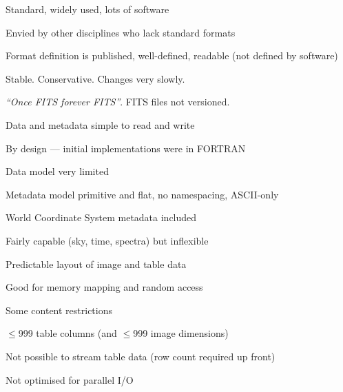 \documentclass[20pt,landscape]{foils}
\begin{document}
\begin{list1}
  \item Standard, widely used, lots of software
\vspace*{-0.2cm}
  \begin{list2}
    \item Envied by other disciplines who lack standard formats
\vspace*{-0.1cm}
  \end{list2}
  \item Format definition is published, well-defined, readable
        (not defined by software)
  \item Stable.  Conservative.  Changes very slowly.
\vspace*{-0.2cm}
  \begin{list2}
    \item {\sl ``Once FITS forever FITS''}.
          FITS files not versioned.
\vspace*{-0.1cm}
  \end{list2}
  \item Data and metadata simple to read and write
\vspace*{-0.2cm}
  \begin{list2}
    \item By design --- initial implementations were in FORTRAN
\vspace*{-0.1cm}
    \item Data model very limited
\vspace*{-0.1cm}
    \item Metadata model primitive and flat, no namespacing, ASCII-only
\vspace*{-0.1cm}
  \end{list2}
  \item World Coordinate System metadata included
\vspace*{-0.2cm}
  \begin{list2}
    \item Fairly capable (sky, time, spectra) but inflexible
\vspace*{-0.1cm}
  \end{list2}
  \item Predictable layout of image and table data
\vspace*{-0.2cm}
  \begin{list2}
    \item Good for memory mapping and random access
\vspace*{-0.1cm}
  \end{list2}
  \item Some content restrictions
\vspace*{-0.2cm}
  \begin{list2}
    \item $\le$999 table columns (and $\le$999 image dimensions)
\vspace*{-0.1cm}
    \item Not possible to stream table data (row count required up front)
\vspace*{-0.1cm}
    \item Not optimised for parallel I/O
\vspace*{-0.1cm}
  \end{list2}
\end{list1}
\end{document}

